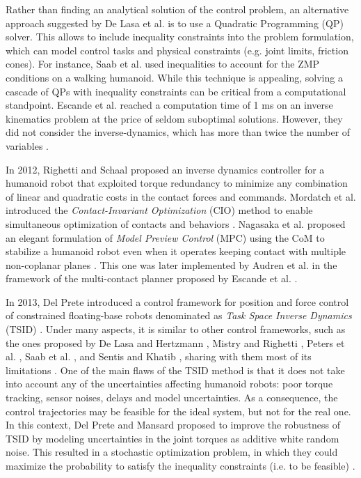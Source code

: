 	Rather than finding an analytical solution of the control problem, an alternative approach suggested
	by De Lasa et al. \cite{DeLasa_IROS2009} is to use a Quadratic Programming (QP) solver.
	This allows to include inequality constraints into the problem formulation, which can model
	control tasks and physical constraints (e.g. joint limits, friction cones).
	For instance, Saab et al. \cite{Saab_ICRA2011} \cite{Saab_IROS2011} \cite{Saab_TransRobotics2013}
	used inequalities to account for the ZMP conditions on a walking humanoid.
	While this technique is appealing, solving a cascade of QPs with inequality constraints can be critical
	from a computational standpoint.
	Escande et al. \cite{Escande_IJRR2014} reached a computation time of 1 ms on an inverse kinematics
	problem at the price of seldom suboptimal solutions.
	However, they did not consider the inverse-dynamics, which has more than twice the number of variables
	\cite{DelPrete_IROS2014}.
	
	In 2012, Righetti and Schaal \cite{Righetti_Humanoids2012} proposed an inverse dynamics controller for
	a humanoid robot that exploited torque redundancy to minimize any combination of linear and quadratic
	costs in the contact forces and commands.
	Mordatch et al. \cite{Mordatch_SIGGRAPH2012} introduced the \emph{Contact-Invariant Optimization}
	(CIO) method to enable simultaneous optimization of contacts and behaviors \cite{Chung_ICRA2015}.
	Nagasaka et al. \cite{Nagasaka_RobotSymp2012} proposed an elegant formulation of
	\emph{Model Preview Control} (MPC) using the CoM to stabilize a humanoid robot even when it
	operates keeping contact with multiple non-coplanar planes \cite{Audren_IROS2014}
	\cite{Nagasaka_RobotSymp2012}.
	This one was later implemented by Audren et al.	\cite{Audren_IROS2014} in the framework of 
	the multi-contact planner proposed by Escande et al. \cite{Escande_RobAutoSys2013}.
	
	In 2013, Del Prete \cite{DelPrete_PhDThesis2013} introduced a control framework for position and force
	control of constrained floating-base robots denominated as \emph{Task Space Inverse Dynamics}	(TSID)
	\cite{DelPrete_PhDThesis2013} \cite{DelPrete_RobAutoSys2015}.
	Under many aspects, it is similar to other control frameworks, such as the ones proposed by
	De Lasa and Hertzmann \cite{DeLasa_IROS2009}, Mistry and Righetti \cite{Mistry_RSS2011},
	Peters et al. \cite{Peters_AutoRobots2008}, Saab et al. \cite{Saab_ICRA2011}, and Sentis and Khatib
	\cite{Sentis_IJHR2005},	sharing with them most of its limitations \cite{DelPrete_PhDThesis2013}.
	One of the main flaws of the TSID method is that it does not take into account any of the uncertainties
	affecting humanoid robots: poor torque tracking, sensor noises, delays and model uncertainties.
	As a consequence, the control trajectories may be feasible for the ideal system, but not for the real one.
	In this context, Del Prete and Mansard \cite{DelPrete_RSS2015} proposed to improve the robustness of
	TSID by modeling uncertainties in the joint torques as additive white random noise.
	This resulted in a stochastic optimization problem, in which they could maximize the probability
	to satisfy the inequality constraints (i.e. to be feasible) \cite{DelPrete_RSS2015}.
	
